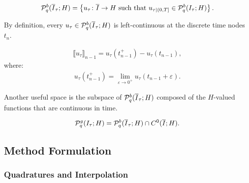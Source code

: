 \begin{definition}
    \begin{align}
        \mathcal{P}_{q}^b(\overline{I}_{\tau}; H) = \left\{ u_{\tau} \colon \overline{I} \rightarrow H \text{ such that } u_{\tau \mid (0, T]} \in \mathcal{P}_{q}^b(I_{\tau}; H) \right\}.
    \end{align}
\end{definition}


By definition, every $u_{\tau} \in \mathcal{P}_{q}^b(\overline{I}_{\tau}; H)$ is left-continuous at the discrete time nodes $t_n$.

\begin{definition} \label{def:time_jumps}
    \begin{align}
        \llbracket u_{\tau} \rrbracket_{n - 1} = u_{\tau}(t_{n - 1}^+) - u_{\tau}(t_{n - 1}),
    \end{align}
    where:
    \begin{align}
        u_{\tau}(t_{n - 1}^+) = \lim_{\varepsilon \rightarrow 0^+} u_{\tau}(t_{n - 1} + \varepsilon).
    \end{align}
\end{definition}

Another useful space is the subspace of $\mathcal{P}_{q}^b(\overline{I}_{\tau}; H)$ composed of the $H$-valued functions that are continuous in time.

\begin{definition}
    \begin{align}
        \mathcal{P}_{q}^g(I_{\tau}; H) = \mathcal{P}_{q}^b(\overline{I}_{\tau}; H) \cap C^0(\overline{I}; H).
    \end{align}
\end{definition}

\newpage
\subsection{Method Formulation}

\subsubsection{Quadratures and Interpolation}

